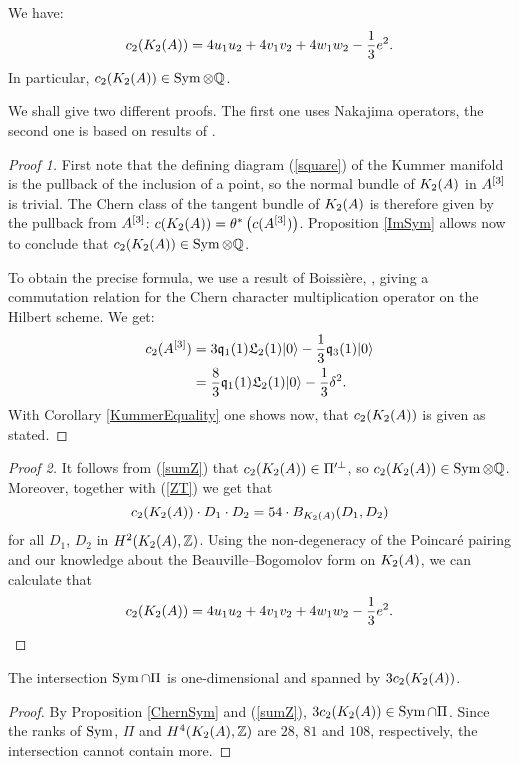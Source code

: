 \begin{proposition} \label{ChernSym}
We have:
\begin{equation}
c_2(K_{ 2 }( A ))= 4 u_1u_2 + 4v_1v_2 + 4 w_1 w_2 - \frac{1}{3} e^2. 
\end{equation}
In particular, $c_2(K_{ 2 }( A ))\in \operatorname{Sym} \otimes\mathbb{Q} $.
\end{proposition}
We shall give two different proofs. The first one uses Nakajima operators, the second one is based on results of \cite{Hassett}.
\begin{proof}[Proof 1]
First note that the defining diagram (\ref{square}) of the Kummer manifold is the pullback of the inclusion of a point, so the normal bundle of $K_{ 2 }( A )$ in $A^{[3]}$ is trivial. The Chern class of the tangent bundle of $K_{ 2 }( A )$ is therefore given by the pullback from $A^{[3]}$: $c(K_{ 2 }( A )) = \theta^*\left(c(A^{[3]})\right)$. Proposition \ref{ImSym} allows now to conclude that $c_2(K_{ 2 }( A ))\in \operatorname{Sym} \otimes \mathbb{Q}$.

To obtain the precise formula, we use a result of Boissi\`ere, \cite[Lemma 3.12]{Boissiere}, giving a commutation relation for the Chern character multiplication operator on the Hilbert scheme. We get:
\begin{align*}
c_2(A^{[3]}) & = 3\mathfrak{q}_1(1)\mathfrak L_2(1)|0\rangle - \frac{1}{3} \mathfrak{q}_3(1)|0\rangle \\
 & =\frac{8}{3}\mathfrak{q}_1(1)\mathfrak L_2(1)|0\rangle - \frac{1}{3} \delta^2 .
\end{align*}
With Corollary \ref{KummerEquality} one shows now, that $c_2(K_{ 2 }( A ))$ is given as stated.
\end{proof}
\begin{proof}[Proof 2]
It follows from (\ref{sumZ}) that $c_2(K_{ 2 }( A ))\in \Pi'^\perp$, so $c_2(K_{ 2 }( A )) \in \operatorname{Sym}\otimes\mathbb{Q}$. Moreover, together with (\ref{ZT}) we get that
\begin{equation*}
c_2(K_{ 2 }( A ))\cdot D_{1}\cdot D_{2}=54\cdot B_{K_{ 2 }( A )}(D_{1},D_{2})
\end{equation*}
for all $D_{1}$, $D_{2}$ in $H^{2}(K_{ 2 }( A ),\mathbb{Z})$. Using the non-degeneracy of the Poincar\'e pairing and our knowledge about the Beauville--Bogomolov form on $K_{ 2 }( A )$, we can calculate that
\[
c_2(K_{ 2 }( A ))= 4 u_1u_2 + 4v_1v_2 + 4 w_1 w_2 - \frac{1}{3} e^2.  \qedhere
\]
\end{proof}


\begin{corollary}\label{Pi'}
The intersection $\operatorname{Sym}\cap \Pi$ is one-dimensional and spanned by $3c_2(K_{ 2 }( A ))$. 
\end{corollary}
\begin{proof}
By Proposition \ref{ChernSym} and (\ref{sumZ}), $3c_2(K_{ 2 }( A ))\in \operatorname{Sym}\cap \Pi$. Since the ranks of $\operatorname{Sym}$, $\Pi$ and $H^4(K_{ 2 }( A ),\mathbb{Z})$ are $28$, $81$ and $108$, respectively, the intersection cannot contain more.
\end{proof}

